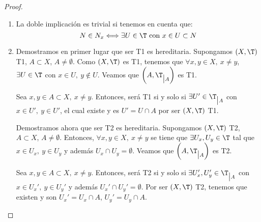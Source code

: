 \begin{proof}
\begin{enumerate}
        \item La doble implicación es trivial si tenemos en cuenta que:
        \begin{equation*}
            N\in N_x\Longleftrightarrow \exists U\in \T \text{ con } x\in U\subset N
        \end{equation*}

        \item Demostramos en primer lugar que ser T1 es hereditaria. Supongamos $(X,\T)$ T1, $A\subset X$, $A\neq \emptyset$. Como $(X,\T)$ es T1, tenemos que $\forall x,y\in X,~x\neq y$, $\exists U\in \T$ con $x\in U,~y\notin U$. Veamos que $\left(A,\T_{\big| A}\right)$ es T1.

        Sea $x,y\in A\subset X,~x\neq y$. Entonces, será T1 si y solo si $\exists U'\in \T_{\big| A}$ con $x\in U',~y\in U'$, el cual existe y es $U'=U\cap A$ por ser $(X,\T)$ T1.\vspace{1em}

        Demostramos ahora que ser T2 es hereditaria. Supongamos $(X,\T)$ T2, $A\subset X$, $A\neq \emptyset$. Entonces, $\forall x,y\in X,~x\neq y$
        se tiene que $\exists U_x,U_y\in \T$ tal que $x\in U_x,~y\in U_y$ y además $U_x\cap U_y=\emptyset$. Veamos que $\left(A,\T_{\big| A}\right)$ es T2.

        Sea $x,y\in A\subset X,~x\neq y$. Entonces, será T2 si y solo si $\exists U_x',U_y'\in \T_{\big| A}$ con $x\in U_x',~y\in U_y'$ y además $U_x'\cap U_y'=\emptyset$. Por ser $(X,\T)$ T2, tenemos que existen y son $U_x'=U_x\cap A$, $U_y'=U_y\cap A$.
    
        
    \end{enumerate}
\end{proof}


